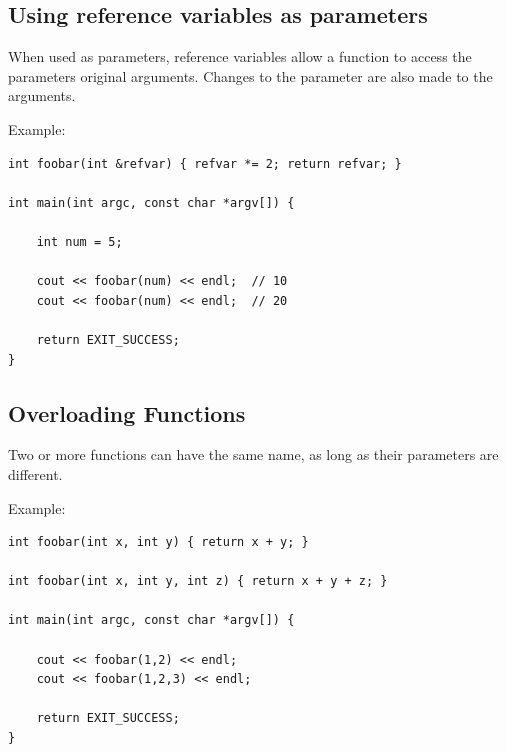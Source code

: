 \documentclass{report}
\begin{document}
    \subsection{Using reference variables as parameters}
    \bigbreak \noindent 
    \begin{concept}
 When used as parameters, reference variables allow a function to access the parameters original arguments. Changes to the parameter are also made to the arguments.
	\end{concept}
    \bigbreak \noindent 
    Example:
    \bigbreak \noindent 
    \sepline
    \begin{verbatim}
int foobar(int &refvar) { refvar *= 2; return refvar; }

int main(int argc, const char *argv[]) {
    
    int num = 5;

    cout << foobar(num) << endl;  // 10
    cout << foobar(num) << endl;  // 20

    return EXIT_SUCCESS;
}
    \end{verbatim}
    \sepline
    
    \bigbreak \noindent 
    \bigbreak \noindent 

    \pagebreak \bigbreak \noindent 
    \subsection{Overloading Functions}
    \bigbreak \noindent 
    \begin{concept}
 Two or more functions can have the same name, as long as their parameters are different.
	\end{concept}
    \bigbreak \noindent 
    Example:
    \bigbreak \noindent 
    \sepline
    \begin{verbatim}
int foobar(int x, int y) { return x + y; }

int foobar(int x, int y, int z) { return x + y + z; }

int main(int argc, const char *argv[]) {

    cout << foobar(1,2) << endl;
    cout << foobar(1,2,3) << endl;

    return EXIT_SUCCESS;
}
    \end{verbatim}
    \sepline

    \bigbreak \noindent \bigbreak \noindent 
\end{document}
